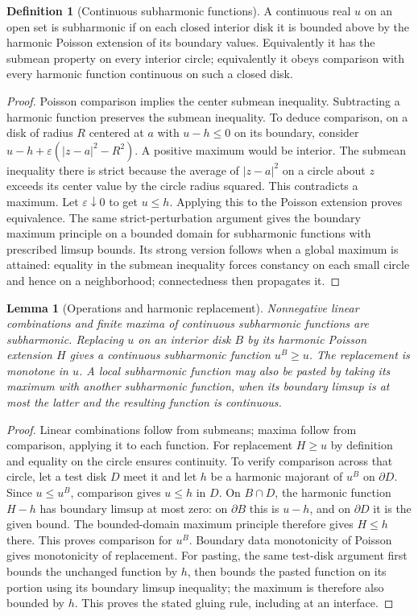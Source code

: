 \documentclass[11pt,a4paper,openany]{book}
\newtheorem{lemma}[theorem]{Lemma}
\theoremstyle{definition}
\newtheorem{definition}[theorem]{Definition}
\theoremstyle{remark}\newtheorem{remark}[theorem]{Remark}
\newcommand{\eps}{\varepsilon}\newcommand{\ee}{\varepsilon}
\newcommand{\family}[1]{}
\begin{document}
\begin{definition}[Continuous subharmonic functions]\family{D12.14.01}\label{d12:14-01}
A continuous real $u$ on an open set is subharmonic if on each closed interior disk it is bounded above by the harmonic Poisson extension of its boundary values. Equivalently it has the submean property on every interior circle; equivalently it obeys comparison with every harmonic function continuous on such a closed disk.
\end{definition}
\begin{proof}
Poisson comparison implies the center submean inequality. Subtracting a harmonic function preserves the submean inequality. To deduce comparison, on a disk of radius $R$ centered at $a$ with $u-h\le0$ on its boundary, consider $u-h+\eps(|z-a|^2-R^2)$. A positive maximum would be interior. The submean inequality there is strict because the average of $|z-a|^2$ on a circle about $z$ exceeds its center value by the circle radius squared. This contradicts a maximum. Let $\eps\downarrow0$ to get $u\le h$. Applying this to the Poisson extension proves equivalence. The same strict-perturbation argument gives the boundary maximum principle on a bounded domain for subharmonic functions with prescribed limsup bounds. Its strong version follows when a global maximum is attained: equality in the submean inequality forces constancy on each small circle and hence on a neighborhood; connectedness then propagates it.
\end{proof}

\begin{lemma}[Operations and harmonic replacement]\family{D12.14.02}\label{d12:14-02}
Nonnegative linear combinations and finite maxima of continuous subharmonic functions are subharmonic. Replacing $u$ on an interior disk $B$ by its harmonic Poisson extension $H$ gives a continuous subharmonic function $u^B\ge u$. The replacement is monotone in $u$. A local subharmonic function may also be pasted by taking its maximum with another subharmonic function, when its boundary limsup is at most the latter and the resulting function is continuous.
\end{lemma}
\begin{proof}
Linear combinations follow from submeans; maxima follow from comparison, applying it to each function. For replacement $H\ge u$ by definition and equality on the circle ensures continuity. To verify comparison across that circle, let a test disk $D$ meet it and let $h$ be a harmonic majorant of $u^B$ on $\partial D$. Since $u\le u^B$, comparison gives $u\le h$ in $D$. On $B\cap D$, the harmonic function $H-h$ has boundary limsup at most zero: on $\partial B$ this is $u-h$, and on $\partial D$ it is the given bound. The bounded-domain maximum principle therefore gives $H\le h$ there. This proves comparison for $u^B$. Boundary data monotonicity of Poisson gives monotonicity of replacement. For pasting, the same test-disk argument first bounds the unchanged function by $h$, then bounds the pasted function on its portion using its boundary limsup inequality; the maximum is therefore also bounded by $h$. This proves the stated gluing rule, including at an interface.
\end{proof}
\end{document}
